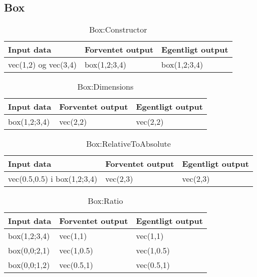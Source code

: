 
\subsection{Box}

\begin{table}[ht]
	\caption{Box:Constructor}
	\centering
	\begin{tabular}{L L L}
		\hline\hline
		Input data & Forventet output & Egentligt output \\ [0.5ex]
		\hline
		vec(1,2) og vec(3,4) & box(1,2;3,4) & box(1,2;3,4)\\
		\hline
	\end{tabular}
\end{table}

\begin{table}[ht]
	\caption{Box:Dimensions}
	\centering
	\begin{tabular}{L L L}
		\hline\hline
		Input data & Forventet output & Egentligt output \\ [0.5ex]
		\hline
		box(1,2;3,4) & vec(2,2) & vec(2,2)\\
		\hline
	\end{tabular}
\end{table}

\begin{table}[ht]
	\caption{Box:RelativeToAbsolute}
	\centering
	\begin{tabular}{L L L}
		\hline\hline
		Input data & Forventet output & Egentligt output \\ [0.5ex]
		\hline
		vec(0.5,0.5) i box(1,2;3,4) & vec(2,3) & vec(2,3)\\
		\hline
	\end{tabular}
\end{table}

\begin{table}[ht]
	\caption{Box:Ratio}
	\centering
	\begin{tabular}{L L L}
		\hline\hline
		Input data & Forventet output & Egentligt output \\ [0.5ex]
		\hline
		box(1,2;3,4) & vec(1,1) & vec(1,1)\\
		box(0,0;2,1) & vec(1,0.5) & vec(1,0.5)\\
		box(0,0;1,2) & vec(0.5,1) & vec(0.5,1)\\
		\hline
	\end{tabular}
\end{table}

